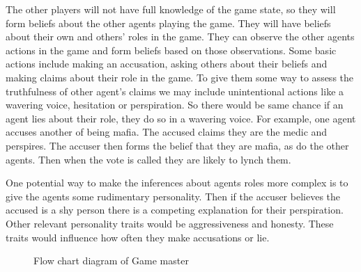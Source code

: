 \documentclass[12pt]{article} %
\begin{document}
The other players will not have full knowledge of the game state, so they will form beliefs about the other agents playing the game. They will have beliefs about their own and others’ roles in the game. They can observe the other agents actions in the game and form beliefs based on those observations. Some basic actions include making an accusation, asking others about their beliefs and making claims about their role in the game. To give them some way to assess the truthfulness of other agent’s claims we may include unintentional actions like a wavering voice, hesitation or perspiration. So there would be same chance if an agent lies about their role, they do so in a wavering voice. For example, one agent accuses another of being mafia. The accused claims they are the medic and perspires. The accuser then forms the belief that they are mafia, as do the other agents. Then when the vote is called they are likely to lynch them. 

One potential way to make the inferences about agents roles more complex is to give the agents some rudimentary personality. Then if the accuser believes the accused is a shy person there is a competing explanation for their perspiration. Other relevant personality traits would be aggressiveness and honesty. These traits would influence how often they make accusations or lie. 




\begin{figure}[H] 
\caption{Flow chart diagram of Game master}
\label{fig:speciation}
\end{figure}
\end{document}
